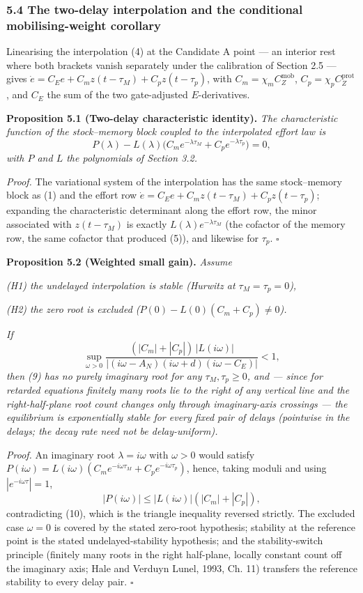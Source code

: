 \documentclass[11pt]{article}
\begin{document}
\subsubsection{5.4 The two-delay interpolation and the conditional
mobilising-weight
corollary}\label{the-two-delay-interpolation-and-the-conditional-mobilising-weight-corollary}

Linearising the interpolation (4) at the Candidate A point --- an
interior rest where both brackets vanish separately under the
calibration of Section 2.5 --- gives
\(\dot e = C_E e + C_m z(t-\tau_M) + C_p z(t-\tau_p)\), with
\(C_m = \chi_m C_Z^{\mathrm{mob}}\),
\(C_p = \chi_p C_Z^{\mathrm{prot}}\), and \(C_E\) the sum of the two
gate-adjusted \(E\)-derivatives.

\textbf{Proposition 5.1 (Two-delay characteristic identity).} \emph{The
characteristic function of the stock--memory block coupled to the
interpolated effort law is}
\[P(\lambda) - L(\lambda)\bigl( C_m e^{-\lambda\tau_M} + C_p e^{-\lambda\tau_p} \bigr) = 0, \tag{9}\]
\emph{with \(P\) and \(L\) the polynomials of Section 3.2.}

\emph{Proof.} The variational system of the interpolation has the same
stock--memory block as (1) and the effort row
\(\dot e = C_E e + C_m z(t-\tau_M) + C_p z(t-\tau_p)\); expanding the
characteristic determinant along the effort row, the minor associated
with \(z(t-\tau_M)\) is exactly \(L(\lambda)e^{-\lambda\tau_M}\) (the
cofactor of the memory row, the same cofactor that produced (5)), and
likewise for \(\tau_p\). \ensuremath{\square}

\textbf{Proposition 5.2 (Weighted small gain).} \emph{Assume}

\emph{(H1) the undelayed interpolation is stable (Hurwitz at
\(\tau_M = \tau_p = 0\)),}

\emph{(H2) the zero root is excluded
(\(P(0) - L(0)(C_m + C_p) \neq 0\)).}

\emph{If}
\[\sup_{\omega > 0} \frac{(|C_m| + |C_p|)\, |L(i\omega)|}{|(i\omega - A_N)(i\omega + d)(i\omega - C_E)|} < 1, \tag{10}\]
\emph{then (9) has no purely imaginary root for any
\(\tau_M, \tau_p \ge 0\), and --- since for retarded equations finitely
many roots lie to the right of any vertical line and the
right-half-plane root count changes only through imaginary-axis
crossings --- the equilibrium is exponentially stable for every fixed
pair of delays (pointwise in the delays; the decay rate need not be
delay-uniform).}

\emph{Proof.} An imaginary root \(\lambda = i\omega\) with
\(\omega > 0\) would satisfy
\(P(i\omega) = L(i\omega)(C_m e^{-i\omega\tau_M} + C_p e^{-i\omega\tau_p})\),
hence, taking moduli and using \(|e^{-i\omega\tau}| = 1\),
\[|P(i\omega)| \le |L(i\omega)|(|C_m| + |C_p|),\] contradicting (10),
which is the triangle inequality reversed strictly. The excluded case
\(\omega = 0\) is covered by the stated zero-root hypothesis; stability
at the reference point is the stated undelayed-stability hypothesis; and
the stability-switch principle (finitely many roots in the right
half-plane, locally constant count off the imaginary axis; Hale and
Verduyn Lunel, 1993, Ch. 11) transfers the reference stability to every
delay pair. \ensuremath{\square}
\end{document}
